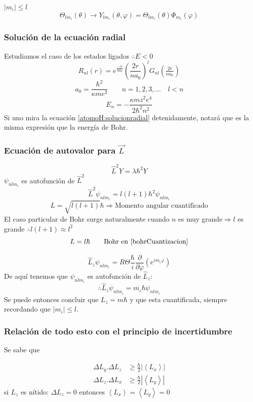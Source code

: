 \documentclass[10pt,twocolumn,titlepage]{article}
\newcommand{\nqm}{ m_{\iota} }
\newcommand{\nql}{l}
\newcommand{\nqn}{n}
\begin{document}
$|\nqm|\leq \nql$
$$ \Theta_{\nql\nqm}(\theta)\longrightarrow Y_{\nql\nqm}(\theta,\varphi)=\Theta_{\nql\nqm}(\theta) \Phi_{\nqm}(\varphi)$$

\subsubsection*{Solución de la ecuación radial}
Estudiamos el caso de los estados ligados $\therefore E<0$
$$ R_{\nqn\nql}(r)=e^{\frac{-zr}{\nqn a_0}}\left( \frac{2r}{\nqn a_0} \right)^\nql G_{\nqn\nql}(\tfrac{2r}{na_0}) $$
$$a_0=\frac{\hbar^2}{\kappa me^2}\qquad n=1,2,3,\ldots \quad \nql<\nqn$$
\begin{equation} \label{atomoH:solucionradial}
E_n=-\frac{\kappa m z^2 e^4}{2\hbar^2 \nqn^2}
\end{equation}
Si uno mira la ecuación \eqref{atomoH:solucionradial} detenidamente, notará que es la misma expresión que la energía de Bohr.
\subsubsection*{Ecuación de autovalor para $\vec{L}$}
$$\hat{L}^2Y=\lambda \hbar^2 Y $$
$\psi_{\nqn\nql\nqm}$ es autofunción de $\hat{L}^2$
$$\hat{L}^2\psi_{\nqn\nql\nqm}=\nql(\nql+1)\hbar^2 \psi_{\nqn\nql\nqm} $$
$$L=\sqrt{\nql(\nql+1)}\hbar\Rightarrow \text{Momento angular cuantificado} $$
El caso particular de Bohr surge naturalmente  cuando $\nqn$ es muy grande$\Rightarrow \nql$ es grande $\therefore \nql(\nql+1)\approx \nql^2$
$$ L=\nql \hbar \qquad \text{Bohr en \eqref{bohrCuantizacion}}$$

$$\hat{L}_z\psi_{\nqn\nql\nqm}=R\Theta \frac{\hbar}{i}\frac{\partial}{\partial \varphi}\left( e^{i\nqm\varphi}\right) $$
De aquí tenemos que $\psi_{\nqn\nql\nqm}$ es autofunción de $\hat{L}_z$:
$$\therefore \hat{L}_z \psi_{\nqn\nql\nqm}=\nqm\hbar \psi_{\nqn\nql\nqm} $$
Se puede entonces concluir que $L_z=m\hbar$ y que esta cuantificada, siempre recordando que $|\nqm|\leq \nql$.
\subsubsection*{Relación de todo esto con el principio de incertidumbre}
Se sabe que 

\begin{align*}
\Delta L_y .\Delta L_z&\geq \frac{\hbar}{2}\left|\left< L_x \right>\right|\\
\Delta L_z .\Delta L_x&\geq \frac{\hbar}{2}\left|\left< L_y \right>\right|
\end{align*}
si $L_z$ es nítido: $\Delta L_z=0$ entonces $\left<L_x \right>=\left<L_y \right>=0$
\end{document}

